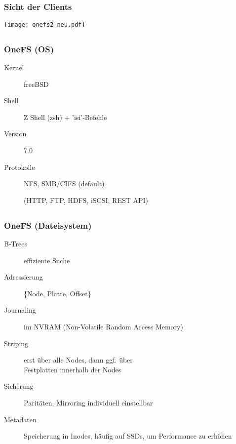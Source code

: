 \documentclass{beamer}
\begin{document}
\subsection{}
\begin{frame}[fragile]
  \frametitle{Sicht der Clients}

  \begin{center}\texttt{[image: onefs2-neu.pdf]}\end{center}

\end{frame}  

\subsection{}
\begin{frame}[fragile]
  \frametitle{OneFS (OS)}

  \begin{description}
    \item[Kernel] freeBSD
    \item[Shell] Z Shell (zsh) + 'isi'-Befehle
    \item[Version] 7.0
    \item[Protokolle] NFS, SMB/CIFS (default)
    \item[] (HTTP, FTP, HDFS, iSCSI, REST API) 

   \end{description}

\end{frame}    

\subsection{}
\begin{frame}[fragile]
  \frametitle{OneFS (Dateisystem)}

  \begin{description}
    \item[B-Trees] effiziente Suche
    \item[Adressierung] \{Node, Platte, Offset\}
    \item[Journaling] im NVRAM (Non-Volatile Random Access Memory)
    \item[Striping] erst über alle Nodes, dann ggf. über \\Festplatten innerhalb der Nodes
    \item[Sicherung] Paritäten, Mirroring individuell einstellbar
    \item[Metadaten] Speicherung in Inodes, häufig auf SSDs, um Performance zu erhöhen
  \end{description}

\end{frame}
\end{document}
